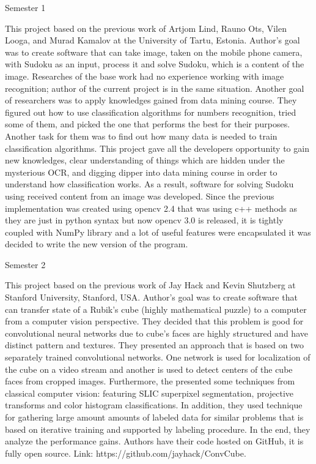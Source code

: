 \documentclass[../main.tex]{subfiles}
\begin{document}

Semester 1

This project based on the previous work of Artjom Lind, Rauno Ots, Vilen Looga, and Murad Kamalov at the University of Tartu, Estonia. Author’s goal was to create software that can take image, taken on the mobile phone camera, with Sudoku as an input, process it and solve Sudoku, which is a content of the image. Researches of the base work had no experience working with image recognition; author of the current project is in the same situation. Another goal of researchers was to apply knowledges gained from data mining course. They figured out how to use classification algorithms for numbers recognition, tried some of them, and picked the one that performs the best for their purposes. Another task for them was to find out how many data is needed to train classification algorithms. This project gave all the developers opportunity to gain new knowledges, clear understanding of things which are hidden under the mysterious OCR, and digging dipper into data mining course in order to understand how classification works. As a result, software for solving Sudoku using received content from an image was developed. Since the previous implementation was created using opencv 2.4 that was using c++ methods as they are just in python syntax but now opencv 3.0 is released, it is tightly coupled with NumPy library and a lot of useful features were encapsulated it was decided to write the new version of the program.

Semester 2

This project based on the previous work of Jay Hack and Kevin Shutzberg at Stanford University, Stanford, USA. Author’s goal was to create software that can transfer state of a Rubik’s cube (highly mathematical puzzle) to a computer from a computer vision perspective. They decided that this problem is good for convolutional neural networks due to cube’s faces are highly structured and have distinct pattern and textures.
They presented an approach that is based on two separately trained convolutional networks. One network is used for localization of the cube on a video stream and another is used to detect centers of the cube faces from cropped images. Furthermore, the presented some techniques from classical computer vision: featuring SLIC superpixel segmentation, projective transforms and color histogram classifications. In addition, they used technique for gathering large amount amounts of labeled data for similar problems that is based on iterative training and supported by labeling procedure. In the end, they analyze the performance gains. Authors have their code hosted on GitHub, it is fully open source. Link: https://github.com/jayhack/ConvCube.
\end{document}
